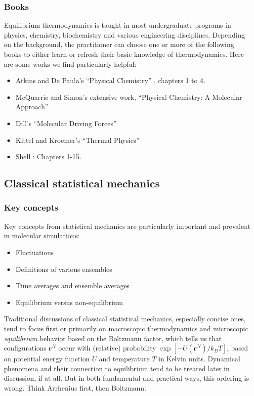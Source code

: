 \documentclass[9pt,bestpractices]{livecoms}
\newcommand{\conf}{\mathbf{r}^N}
\begin{document}
\subsubsection{Books}
Equilibrium thermodynamics is taught in most undergraduate programs in physics, chemistry, biochemistry and various engineering disciplines.
Depending on the background, the practitioner can choose one or more of the following books to either learn or refresh their basic knowledge of thermodynamics. 
Here are some works we find particularly helpful:
\begin{itemize}
\item Atkins and De Paula's ``Physical Chemistry'' \cite{AtkinsBook}, chapters 1 to 4.
\item McQuarrie and Simon's extensive work, ``Physical Chemistry: A Molecular Approach''~\cite{McQuarrie:1997:}
\item Dill's ``Molecular Driving Forces''~\cite{DillBook}
\item Kittel and Kroemer's ``Thermal Physics''~\cite{Kittel:1980:}
\item Shell \cite{ShellBook}: Chapters 1-15.
\end{itemize}


\subsection{Classical statistical mechanics}
\label{sec:stat_mech}
\subsubsection{Key concepts}
Key concepts from statistical mechanics are particularly important and prevalent in molecular simulations:
\begin{itemize}
\item Fluctuations
\item Definitions of various ensembles
\item Time averages and ensemble averages
\item Equilibrium versus non-equilibrium
\end{itemize}

Traditional discussions of classical statistical mechanics, especially concise ones, tend to focus first or primarily on macroscopic thermodynamics and microscopic \emph{equilibrium} behavior based on the Boltzmann factor, which tells us that configurations $\conf$ occur with (relative) probability $\exp[-U(\conf)/k_B T]$, based on potential energy function $U$ and temperature $T$ in Kelvin units.  
Dynamical phenomena and their connection to equilibrium tend to be treated later in discussion, if at all.  
But in both fundamental and practical ways, this ordering is wrong.  
Think Arrhenius first, then Boltzmann.
\end{document}

